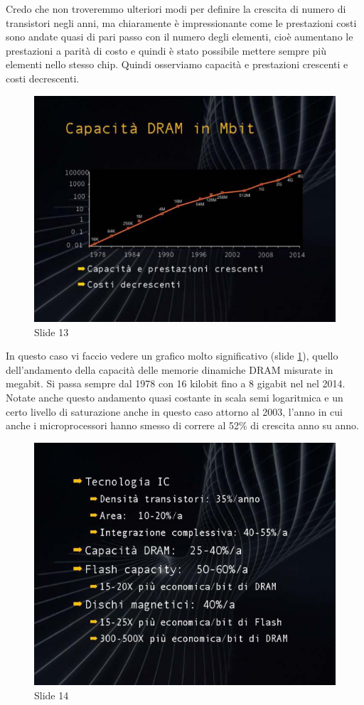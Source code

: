 Credo che non troveremmo ulteriori modi per definire la crescita di numero di transistori negli anni, ma chiaramente è impressionante come le prestazioni costi sono andate quasi di pari passo con il numero degli elementi, cioè aumentano le prestazioni a parità di costo e quindi è stato possibile mettere sempre più elementi nello stesso chip.
Quindi osserviamo capacità e prestazioni crescenti e costi decrescenti.


\begin{figure}[ht]
    \centering
    \includegraphics[width=0.8\linewidth]{images/Lez01_p03_fig_01.png}
    \caption{Slide 13}
    \label{fig:slide_13}
\end{figure}

In questo caso vi faccio vedere un grafico molto significativo (slide \ref{fig:slide_13}), quello dell'andamento della capacità delle memorie dinamiche DRAM misurate in megabit. Si passa sempre dal 1978 con 16 kilobit fino a 8 gigabit nel nel 2014.
Notate anche questo andamento quasi costante in scala semi logaritmica e un certo livello di saturazione anche in questo caso attorno al 2003, l'anno in cui anche i microprocessori hanno smesso di correre al 52\% di crescita anno su anno.


\begin{figure}[ht]
    \centering
    \includegraphics[width=0.8\linewidth]{images/Lez01_p03_fig_02.png}
    \caption{Slide 14}
    \label{fig:slide_14}
\end{figure}

